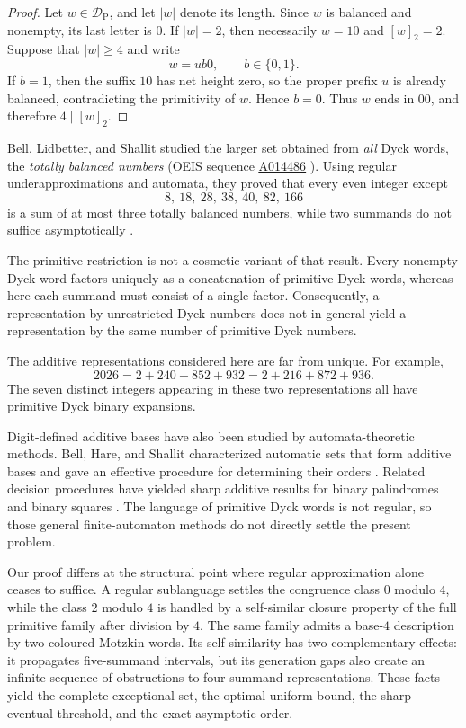\documentclass[12pt]{article}
\theoremstyle{plain}
\theoremstyle{definition}
\theoremstyle{plain}
\newcommand{\DP}{\mathcal{D}_{\mathrm{P}}}
\newcommand{\seqnum}[1]{\href{https://oeis.org/#1}{\rm \underline{#1}}}
\begin{document}
\begin{proof}
Let $w\in\DP$, and let $|w|$ denote its length.  Since $w$ is balanced and
nonempty, its last letter is $0$.  If $|w|=2$, then necessarily $w=10$ and
$[w]_2=2$.  Suppose that $|w|\geq4$ and write
\[
 w=ub0,\qquad b\in\{0,1\}.
\]
If $b=1$, then the suffix $10$ has net height zero, so the proper prefix
$u$ is already balanced, contradicting the primitivity of $w$.  Hence
$b=0$.  Thus $w$ ends in $00$, and therefore $4\mid[w]_2$.
\end{proof}

Bell, Lidbetter, and Shallit studied the larger set obtained from
\emph{all} Dyck words, the \emph{totally balanced numbers} (OEIS sequence
\seqnum{A014486} \cite{OEIS-A014486}).  Using regular underapproximations and automata,
they proved that every even integer except
\[
        8,\ 18,\ 28,\ 38,\ 40,\ 82,\ 166
\]
is a sum of at most three totally balanced numbers, while two summands
do not suffice asymptotically \cite[Thm.\ 14]{BLS}.

The primitive restriction is not a cosmetic variant of that result.
Every nonempty Dyck word factors uniquely as a concatenation of
primitive Dyck words, whereas here each summand must consist of a single
factor.  Consequently, a representation by unrestricted Dyck numbers
does not in general yield a representation by the same number of
primitive Dyck numbers.

The additive representations considered here are far from unique.  For
example,
\[
 2026=2+240+852+932=2+216+872+936.
\]
The seven distinct integers appearing in these two representations all
have primitive Dyck binary expansions.

Digit-defined additive bases have also been studied by automata-theoretic
methods.  Bell, Hare, and Shallit characterized automatic sets that form
additive bases and gave an effective procedure for determining their
orders \cite{BHS}.  Related decision procedures have yielded sharp
additive results for binary palindromes \cite{RSS} and binary squares
\cite{MNRS}.  The language of primitive Dyck words is not regular, so
those general finite-automaton methods do not directly settle the
present problem.

Our proof differs at the structural point where regular approximation
alone ceases to suffice.  A regular sublanguage settles the congruence
class $0$ modulo $4$, while the class $2$ modulo $4$ is handled by a
self-similar closure property of the full primitive family after division
by $4$.  The same family admits a base-$4$ description by two-coloured
Motzkin words.  Its self-similarity has two complementary effects: it
propagates five-summand intervals, but its generation gaps also create an
infinite sequence of obstructions to four-summand representations.  These
facts yield the complete exceptional set, the optimal uniform bound, the
sharp eventual threshold, and the exact asymptotic order.
\end{document}
